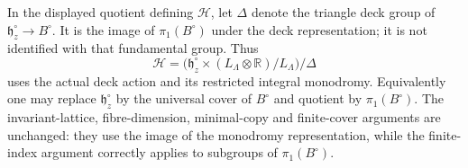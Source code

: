 In the displayed quotient defining $\mathcal H$, let $\Delta$
denote the triangle deck group of
$\mathfrak h_z^\circ\longrightarrow B^\circ$.
It is the image of $\pi_1(B^\circ)$ under the deck representation;
it is not identified with that fundamental group. Thus
\[
 \mathcal H=\bigl(\mathfrak h_z^\circ\times
       (L_\Lambda\otimes\mathbb R)/L_\Lambda\bigr)/\Delta
\]
uses the actual deck action and its restricted integral monodromy.
Equivalently one may replace $\mathfrak h_z^\circ$ by the universal
cover of $B^\circ$ and quotient by $\pi_1(B^\circ)$.
The invariant-lattice, fibre-dimension, minimal-copy and finite-cover
arguments are unchanged: they use the image of the monodromy
representation, while the finite-index argument correctly applies
to subgroups of $\pi_1(B^\circ)$.

